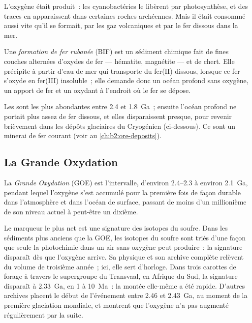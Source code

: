 L'oxygène était produit~: les cyanobactéries le libèrent par photosynthèse, et des traces en apparaissent dans
certaines roches archéennes. Mais il était consommé aussi vite qu'il se formait, par les gaz volcaniques et par le fer
dissous dans la mer.

\begin{definition}\label{def:b2:precambrian-earth:bif}
Une \emph{formation de fer rubanée} (BIF) est un sédiment chimique
fait de fines couches alternées d'oxydes de fer --- hématite, magnétite --- et de chert. Elle précipite
à partir d'eau de mer qui transporte du fer(II) dissous, lorsque ce fer s'oxyde en fer(III) insoluble~;
elle demande donc un océan profond sans oxygène, un apport de fer
et un oxydant à l'endroit où le fer se dépose.
\end{definition}

Les  sont les plus abondantes entre 2.4 et \qty{1.8}{Ga}~; ensuite l'océan profond
ne portait plus assez de fer dissous, et elles disparaissent presque, pour revenir brièvement dans les
dépôts glaciaires du Cryogénien (ci-dessous). Ce sont un minerai de fer courant
(voir au \cref{ch:b2:ore-deposits}).

\subsection*{La Grande Oxydation}

\begin{definition}\label{def:b2:precambrian-earth:goe}
La \emph{Grande Oxydation} (GOE) est l'intervalle, d'environ
2.4--2.3 à environ \qty{2.1}{Ga}, pendant lequel l'oxygène s'est accumulé pour la première fois
de façon durable dans l'atmosphère et dans l'océan de surface, passant de moins d'un millionième
de son niveau actuel à peut-être un dixième.
\end{definition}

Le marqueur le plus net est une signature des isotopes du soufre. Dans les sédiments plus anciens que la GOE, les
isotopes du soufre sont triés d'une façon que seule la photochimie dans un air sans oxygène peut produire~; la signature
disparaît dès que l'oxygène arrive. Sa physique et son archive complète relèvent du volume de troisième année~;
ici, elle sert d'horloge. Dans trois carottes de forage à travers le supergroupe du Transvaal, en Afrique du Sud,
la signature disparaît à \qty{2.33}{Ga}, en 1 à \qty{10}{Ma}~: la montée elle-même a été rapide. D'autres archives
placent le début de l'événement entre 2.46 et \qty{2.43}{Ga}, au moment de la première glaciation mondiale,
et montrent que l'oxygène n'a pas augmenté régulièrement
par la suite.

